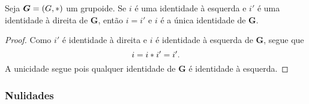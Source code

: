 \begin{proposition}
\label{prop:unic.elem.neut}
Seja $\bm G = (G,\ast)$ um grupoide. Se $i$ é uma identidade à esquerda e $i'$ é uma identidade à direita de $\bm G$, então $i = i'$ e $i$ é a única identidade de $\bm G$.
\end{proposition}
\begin{proof}
Como $i'$ é identidade à direita e $i$ é identidade à esquerda de $\bm G$, segue que
	\begin{equation*}
	i = i \ast i' = i'.
	\end{equation*}
A unicidade segue pois qualquer identidade de $\bm G$ é identidade à esquerda.
\end{proof}

\subsubsection{Nulidades}

\begin{comment}
\begin{definition}[Nulidade]
Seja $\bm G=(G,\opb)$ um grupoide.
	\begin{itemize}
	\item Uma \emph{nulidade à esquerda} de $\bm G$ é um elemento $\nulo \in G$ que satisfaz, para todo $x \in G$,
		\begin{equation*}
		\nulo \opb x = \nulo;
		\end{equation*}
	\item Uma \emph{nulidade à direita} de $\bm G$ é um elemento $\nulo \in G$ que satisfaz, para todo $x \in G$,
		\begin{equation*}
		x \opb \nulo = \nulo;
		\end{equation*}
	\item Uma \emph{nulidade} de $\bm G$ é um elemento $\nulo \in G$ que satisfaz, para todo $x \in G$,
		\begin{equation*}
		\nulo \opb x = \nulo = x \opb \nulo.
		\end{equation*}
	\end{itemize}
\end{definition}
\end{comment}

